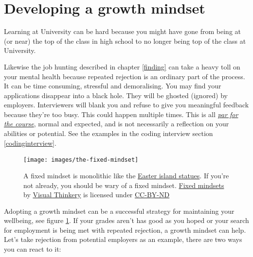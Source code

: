 \documentclass[
]{book}
\begin{document}
\hypertarget{growthmindset}{%
\section{Developing a growth mindset}\label{growthmindset}}

Learning at University can be hard because you might have gone from being at (or near) the top of the class in high school to no longer being top of the class at University.

Likewise the job hunting described in chapter \ref{finding} can take a heavy toll on your mental health because repeated rejection is an ordinary part of the process. It can be time consuming, stressful and demoralising. You may find your applications disappear into a black hole. They will be ghosted (ignored) by employers. Interviewers will blank you and refuse to give you meaningful feedback because they're too busy. This could happen multiple times. This is all \emph{\href{https://en.wiktionary.org/wiki/par_for_the_course}{par for the course}}, normal and expected, and is not necessarily a reflection on your abilities or potential. See the examples in the coding interview section \ref{codinginterview}. \citep{youtube-petia}

\begin{figure}

{\centering \texttt{[image: images/the-fixed-mindset]} 

}

\caption{A fixed mindset is monolithic like the \href{https://en.wikipedia.org/wiki/Moai}{Easter island statues}. If you're not already, you should be wary of a fixed mindset. \href{https://bryanmmathers.com/fixed-mindsets/}{Fixed mindsets} by \href{https://visualthinkery.com}{Visual Thinkery} is licensed under \href{https://creativecommons.org/licenses/by-nd/4.0/}{CC-BY-ND}}\label{fig:fixedminset-fig}
\end{figure}



Adopting a growth mindset can be a successful strategy for maintaining your wellbeing, see figure \ref{fig:fixedminset-fig}. If your grades aren't has good as you hoped or your search for employment is being met with repeated rejection, a growth mindset can help. Let's take rejection from potential employers as an example, there are two ways you can react to it:
\end{document}
